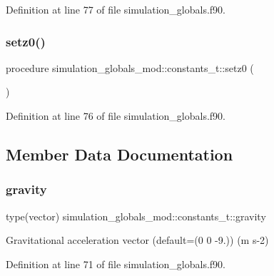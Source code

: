 Definition at line 77 of file simulation\+\_\+globals.\+f90.

\mbox{\label{structsimulation__globals__mod_1_1constants__t_a0ad20f9a9b8c4fd0a6813415e690353a}} 
\subsubsection{\texorpdfstring{setz0()}{setz0()}}
{\footnotesize\ttfamily procedure simulation\+\_\+globals\+\_\+mod\+::constants\+\_\+t\+::setz0 (\begin{DoxyParamCaption}{ }\end{DoxyParamCaption})\hspace{0.3cm}{\ttfamily [private]}}



Definition at line 76 of file simulation\+\_\+globals.\+f90.



\subsection{Member Data Documentation}
\mbox{\label{structsimulation__globals__mod_1_1constants__t_ab1d29ee73044e2bb7b47ca302e2cfdf9}} 
\subsubsection{\texorpdfstring{gravity}{gravity}}
{\footnotesize\ttfamily type(vector) simulation\+\_\+globals\+\_\+mod\+::constants\+\_\+t\+::gravity\hspace{0.3cm}{\ttfamily [private]}}



Gravitational acceleration vector (default=(0 0 -\/9.)) (m s-\/2) 



Definition at line 71 of file simulation\+\_\+globals.\+f90.


